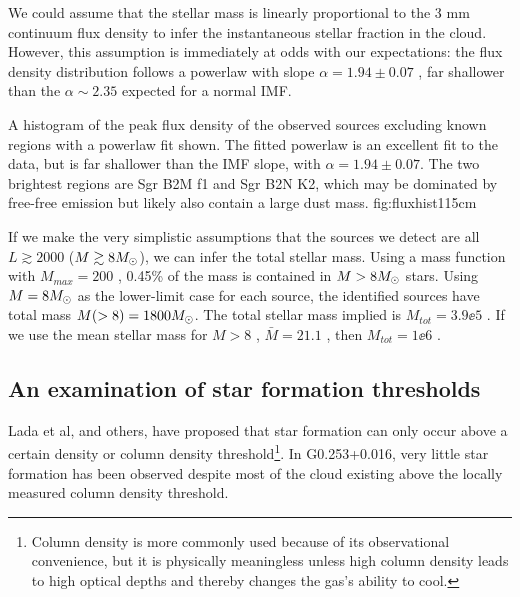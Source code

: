\documentclass{emulateapj}
\newcommand{\ncores}{138\xspace}
\begin{document}
We could assume that the stellar mass is linearly proportional to the 3 mm
continuum flux density to infer the instantaneous stellar fraction in the cloud.
However, this assumption is immediately at odds with our expectations: the
flux density distribution follows a powerlaw with slope $\alpha=1.94\pm0.07$
\citep[fitted with the MLE method of][]{Clauset2007a}, far shallower than the
$\alpha\sim2.35$ expected for a normal IMF.

{A histogram of the peak flux density of the observed sources excluding known
\hii regions with a powerlaw fit shown.  The fitted powerlaw is an excellent
fit to the data, but is far shallower than the IMF slope, with
$\alpha=1.94\pm0.07$.  The two brightest regions are Sgr B2M f1 and Sgr B2N K2,
which may be dominated by free-free emission but likely also contain a large
dust mass.}
{fig:fluxhist}{1}{15cm}

If we make the very simplistic assumptions that the sources we detect are all
$L\gtrsim2000$ \Lsun ($M\gtrsim8 M_{\odot}$),  we can infer the total stellar mass.
Using a \citet{Kroupa2001a} mass function with $M_{max}=200$ \msun, 0.45\% of
the mass is contained in $M>8M_{\odot}$ stars.  Using $M=8M_{\odot}$ as the lower-limit
case for each source, the identified sources have total mass $M(>8)=1800M_{\odot}$.
The total stellar mass implied is $M_{tot} = 3.9\ee{5}$ \msun.  If we use the
mean stellar mass for $M>8$ \msun, $\bar{M}=21.1$ \msun, then $M_{tot}=1\ee{6}$
\msun.





% 

\subsection{An examination of star formation thresholds}
Lada et al, and others, have proposed that star formation can only occur above
a certain density or column density threshold\footnote{Column density is more
commonly used because of its observational convenience, but it is physically
meaningless unless high column density leads to high optical depths and thereby
changes the gas's ability to cool.}.  In G0.253+0.016, very little star formation
has been observed \citep{Longmore2013a,Johnston2014a,Rathborne2015a} despite
most of the cloud existing above the locally measured column density threshold.
\end{document}

